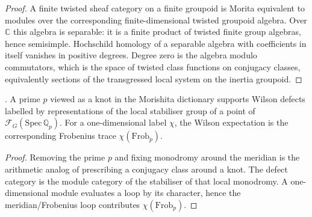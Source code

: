 \begin{proof}
A finite twisted sheaf category on a finite groupoid is Morita
equivalent to modules over the corresponding finite-dimensional
twisted groupoid algebra. Over \(\mathbb C\) this algebra is separable:
it is a finite product of twisted finite group algebras, hence
semisimple. Hochschild homology of a separable algebra with coefficients
in itself vanishes in positive degrees. Degree zero is the algebra
modulo commutators, which is the space of twisted class functions on
conjugacy classes, equivalently sections of the transgressed local
system on the inertia groupoid.
\end{proof}

\begin{corollary}
\label{v4-arith:3d-acs:cor:finite-wilson}
\ClaimStatusProvedHere. A prime \(p\) viewed as a knot in the
Morishita dictionary supports Wilson defects labelled by
representations of the local stabiliser group of a point of
\(\mathcal F_{G}(\mathrm{Spec}\,\mathbb Q_{p})\). For a
one-dimensional label \(\chi\), the Wilson expectation is the
corresponding Frobenius trace \(\chi(\mathrm{Frob}_{p})\).
\end{corollary}

\begin{proof}
Removing the prime \(p\) and fixing monodromy around the meridian is
the arithmetic analog of prescribing a conjugacy class around a knot.
The defect category is the module category of the stabiliser of that
local monodromy. A one-dimensional module evaluates a loop by its
character, hence the meridian/Frobenius loop contributes
\(\chi(\mathrm{Frob}_{p})\).
\end{proof}

